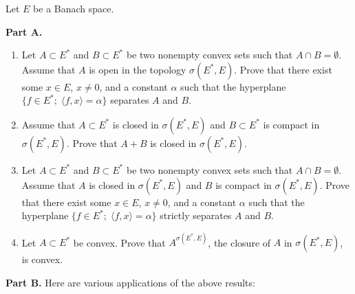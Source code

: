 \documentclass[12pt]{article}
\newcommand{\ip}[2]{\langle #1, #2 \rangle}
\begin{document}
\medskip

Let $E$ be a Banach space.

\noindent\textbf{Part A.}

\begin{enumerate}
\item Let $A \subset E^*$ and $B \subset E^*$ be two nonempty convex sets such that $A \cap B = \emptyset$.
Assume that $A$ is open in the topology $\sigma(E^*, E)$. Prove that there exist some
$x \in E$, $x \neq 0$, and a constant $\alpha$ such that the hyperplane $\{f \in E^*;\; \ip{f}{x} = \alpha\}$
separates $A$ and $B$.

\item Assume that $A \subset E^*$ is closed in $\sigma(E^*, E)$ and $B \subset E^*$ is compact in
$\sigma(E^*, E)$. Prove that $A + B$ is closed in $\sigma(E^*, E)$.

\item Let $A \subset E^*$ and $B \subset E^*$ be two nonempty convex sets such that $A \cap B = \emptyset$.
Assume that $A$ is closed in $\sigma(E^*, E)$ and $B$ is compact in $\sigma(E^*, E)$. Prove that
there exist some $x \in E$, $x \neq 0$, and a constant $\alpha$ such that the hyperplane
$\{f \in E^*;\; \ip{f}{x} = \alpha\}$ strictly separates $A$ and $B$.

\item Let $A \subset E^*$ be convex. Prove that $A^{\sigma(E^*,E)}$, the closure of $A$ in $\sigma(E^*,E)$,
is convex.
\end{enumerate}

\noindent\textbf{Part B.} Here are various applications of the above results:
\end{document}
